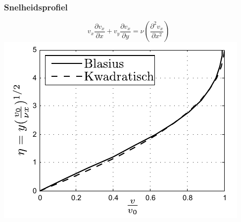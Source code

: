\documentclass[t]{beamer}
\begin{document}
  	\begin{frame}
		\frametitle{Snelheidsprofiel}
		\begin{equation*}
			v_x \frac{\partial v_x}{\partial x} + v_y \frac{\partial v_x}{\partial y} = \nu \left( \frac{\partial^2 v_x}{\partial x^2} \right)
		\end{equation*}
		\pause
		\center
		\includegraphics{fig/uitwendige_stroming/Grenslaagsnelheid}
  	\end{frame}
\end{document}
